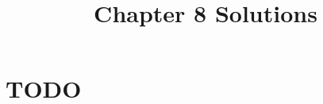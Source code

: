 \documentclass[12pt]{article}
\title{Chapter 8 Solutions}
\begin{document}
\section{TODO}
\end{document}
